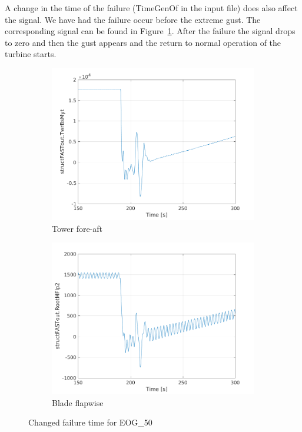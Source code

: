 \documentclass[10pt]{article}
\begin{document}
A change in the time of the failure (TimeGenOf in the input file) does also affect the signal. We have had the failure occur before the extreme gust. The corresponding signal can be found in Figure~\ref{fig:lc23failtime}.
After the failure the signal drops to zero and then the gust appears and the return to normal operation of the turbine starts.
\begin{figure}[H]
  \centering
\begin{subfigure}{0.40\textwidth}
  \includegraphics[width=1\linewidth]{../CIP_6/FASTextreme/EOG_50_failtime/TwrBsMyt.png}
    \caption{Tower fore-aft}
\end{subfigure}
\begin{subfigure}{0.40\textwidth}
  \includegraphics[width=1\linewidth]{../CIP_6/FASTextreme/EOG_50_failtime/RootMFlp2.png}
    \caption{Blade flapwise}
\end{subfigure}
\caption{Changed failure time for EOG\_50}
\label{fig:lc23failtime}
\end{figure}
\end{document}
